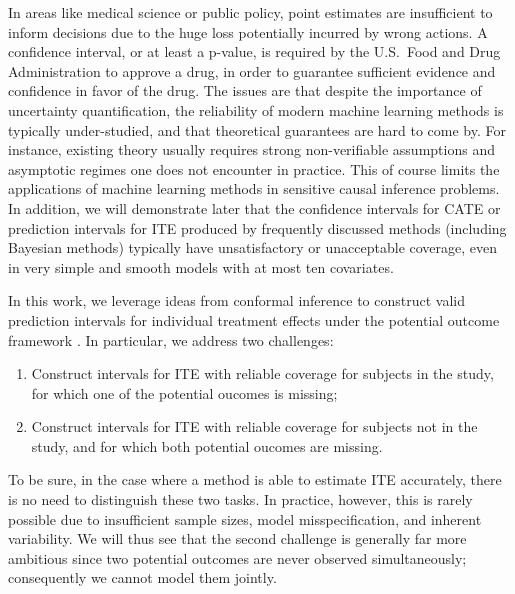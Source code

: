   In areas like medical science or public policy, point estimates are
  insufficient to inform decisions due to the huge loss potentially
  incurred by wrong actions. A confidence interval, or at least a
  p-value, is required by the U.S.~Food and Drug Administration to
  approve a drug, in order to guarantee sufficient evidence and
  confidence in favor of the drug. The issues are that despite the
  importance of uncertainty quantification, the reliability of modern
  machine learning methods is typically under-studied, and that
  theoretical guarantees are hard to come by. For instance, existing
  theory usually requires strong non-verifiable assumptions and
  asymptotic regimes one does not encounter in practice. This of
  course limits the applications of machine learning methods in
  sensitive causal inference problems.  In addition, we will
  demonstrate later that the confidence intervals for CATE or prediction intervals for ITE
  produced by frequently discussed methods (including Bayesian
  methods) typically have unsatisfactory or unacceptable coverage,
  even in very simple and smooth models with at most ten
  covariates.


In this work, we leverage ideas from conformal inference to construct
valid prediction intervals for individual treatment effects under the
potential outcome framework \citep{neyman1923application,
  rubin1974estimating}. In particular, we address two challenges:
\begin{enumerate}[(1)]
\item Construct intervals for ITE with reliable coverage for subjects
  in the study, for which one of the potential oucomes is missing;
\item Construct intervals for ITE with reliable coverage for subjects
  not in the study, and for which both potential oucomes are missing.
\end{enumerate}
To be sure, in the case where a method is able to estimate ITE
accurately, there is no need to distinguish these two tasks. In
practice, however, this is rarely possible due to insufficient sample
sizes, model misspecification, and inherent variability. We will thus see that the second challenge is generally far more ambitious since two potential outcomes are never observed simultaneously; consequently we cannot model them jointly.%

